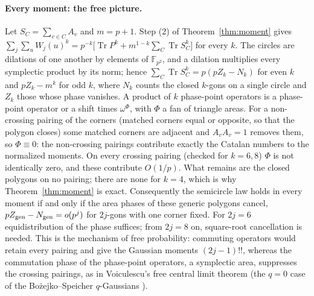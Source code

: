 \documentclass[11pt]{article}
\theoremstyle{remark}
\newcommand{\F}{\mathbb{F}}
\newcommand{\Tr}{\operatorname{Tr}}
\begin{document}
\paragraph{Every moment: the free picture.} Let $S_C=\sum_{v\in C}A_v$ and $m=p+1$. Step (2) of
Theorem~\ref{thm:moment} gives $\sum_j\sum_uW_j(u)^k=p^{-k}\big[\Tr P^k+m^{1-k}\sum_C\Tr S_C^k\big]$ for every $k$.
The circles are dilations of one another by elements of $\F_{p^2}$, and a dilation multiplies every symplectic product by
its norm; hence $\sum_C\Tr S_C^k=p(pZ_k-N_k)$ for even $k$ and $pZ_k-m^k$ for odd $k$, where $N_k$ counts the closed
$k$-gons on a single circle and $Z_k$ those whose phase vanishes. A product of $k$ phase-point operators is a phase-point
operator or a shift times $\omega^{\Phi}$, with $\Phi$ a fan of triangle areas. For a non-crossing pairing of the
corners (matched corners equal or opposite, so that the polygon closes) some matched corners are adjacent and
$A_vA_v=1$ removes them, so $\Phi\equiv0$: the non-crossing pairings contribute exactly the Catalan numbers to the
normalized moments. On every crossing pairing (checked for $k=6,8$) $\Phi$ is not identically zero, and these
contribute $O(1/p)$. What remains are the closed polygons on no pairing; there are none for $k=4$, which is why
Theorem~\ref{thm:moment} is exact. Consequently the semicircle law holds in every moment if and only if the area phases
of these generic polygons cancel, $pZ_{\rm gen}-N_{\rm gen}=o(p^{j})$ for $2j$-gons with one corner fixed. For $2j=6$
equidistribution of the phase suffices; from $2j=8$ on, square-root cancellation is needed. This is the mechanism of
free probability: commuting operators would retain every pairing and give the Gaussian moments $(2j-1)!!$, whereas the
commutation phase of the phase-point operators, a symplectic area, suppresses the crossing pairings, as in Voiculescu's
free central limit theorem \cite{VDN1992} (the $q=0$ case of the Bo\.zejko--Speicher $q$-Gaussians \cite{BozejkoSpeicher1991}).
\end{document}
